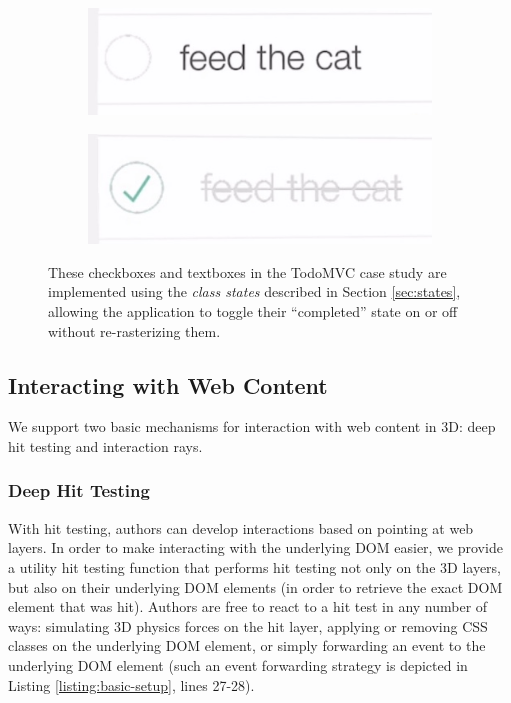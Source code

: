\documentclass[sigconf]{acmart}
\begin{document}
\begin{figure}[t]
  \centering
    \begin{subfigure}{0.48\linewidth}
    \centering
    \includegraphics[trim={16px 30px 0 30px},clip, width=\linewidth]{todo-unchecked.jpg}
    \end{subfigure}
    \begin{subfigure}{0.48\linewidth}
    \centering
    \includegraphics[trim={16px 30px 0 30px},clip, width=\linewidth]{todo-checked.jpg}
    \end{subfigure}
  \caption{These checkboxes and textboxes in the TodoMVC case study are implemented using the \textit{class states} described in Section \ref{sec:states}, allowing the application to toggle their ``completed'' state on or off without re-rasterizing them.}
  \Description{}
  \label{fig:hover}
\end{figure}

\subsection{Interacting with Web Content}
We support two basic mechanisms for interaction with web content in 3D: deep hit testing and interaction rays. 

\subsubsection{Deep Hit Testing} 
With hit testing, authors can develop interactions based on pointing at web layers. In order to make interacting with the underlying DOM easier, we provide a utility hit testing function that performs hit testing not only on the 3D layers, but also on their underlying DOM elements (in order to retrieve the exact DOM element that was hit). Authors are free to react to a hit test in any number of ways: simulating 3D physics forces on the hit layer, applying or removing CSS classes on the underlying DOM element, or simply forwarding an event to the underlying DOM element (such an event forwarding strategy is depicted in Listing \ref{listing:basic-setup}, lines 27-28).
\end{document}
